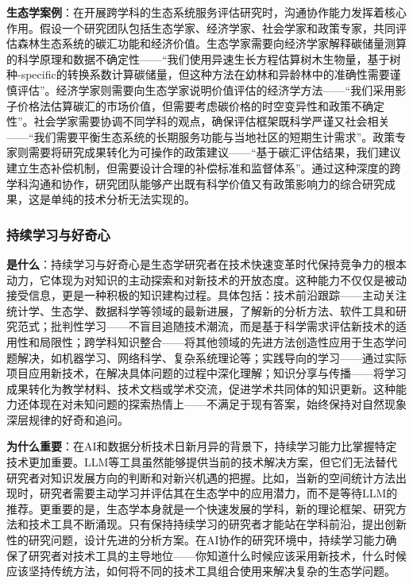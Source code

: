 \documentclass[
  twoside]{book}
\begin{document}
\textbf{生态学案例}：在开展跨学科的生态系统服务评估研究时，沟通协作能力发挥着核心作用。假设一个研究团队包括生态学家、经济学家、社会学家和政策专家，共同评估森林生态系统的碳汇功能和经济价值。生态学家需要向经济学家解释碳储量测算的科学原理和数据不确定性------``我们使用异速生长方程估算树木生物量，基于树种-specific的转换系数计算碳储量，但这种方法在幼林和异龄林中的准确性需要谨慎评估''。经济学家则需要向生态学家说明价值评估的经济学方法------``我们采用影子价格法估算碳汇的市场价值，但需要考虑碳价格的时空变异性和政策不确定性''。社会学家需要协调不同学科的观点，确保评估框架既科学严谨又社会相关------``我们需要平衡生态系统的长期服务功能与当地社区的短期生计需求''。政策专家则需要将研究成果转化为可操作的政策建议------``基于碳汇评估结果，我们建议建立生态补偿机制，但需要设计合理的补偿标准和监督体系''。通过这种深度的跨学科沟通和协作，研究团队能够产出既有科学价值又有政策影响力的综合研究成果，这是单纯的技术分析无法实现的。

\hypertarget{ux6301ux7eedux5b66ux4e60ux4e0eux597dux5947ux5fc3}{%
\subsubsection{持续学习与好奇心}\label{ux6301ux7eedux5b66ux4e60ux4e0eux597dux5947ux5fc3}}

\textbf{是什么}：持续学习与好奇心是生态学研究者在技术快速变革时代保持竞争力的根本动力，它体现为对知识的主动探索和对新技术的开放态度。这种能力不仅仅是被动接受信息，更是一种积极的知识建构过程。具体包括：技术前沿跟踪------主动关注统计学、生态学、数据科学等领域的最新进展，了解新的分析方法、软件工具和研究范式；批判性学习------不盲目追随技术潮流，而是基于科学需求评估新技术的适用性和局限性；跨学科知识整合------将其他领域的先进方法创造性应用于生态学问题解决，如机器学习、网络科学、复杂系统理论等；实践导向的学习------通过实际项目应用新技术，在解决具体问题的过程中深化理解；知识分享与传播------将学习成果转化为教学材料、技术文档或学术交流，促进学术共同体的知识更新。这种能力还体现在对未知问题的探索热情上------不满足于现有答案，始终保持对自然现象深层规律的好奇和追问。

\textbf{为什么重要}：在AI和数据分析技术日新月异的背景下，持续学习能力比掌握特定技术更加重要。LLM等工具虽然能够提供当前的技术解决方案，但它们无法替代研究者对知识发展方向的判断和对新兴机遇的把握。比如，当新的空间统计方法出现时，研究者需要主动学习并评估其在生态学中的应用潜力，而不是等待LLM的推荐。更重要的是，生态学本身就是一个快速发展的学科，新的理论框架、研究方法和技术工具不断涌现。只有保持持续学习的研究者才能站在学科前沿，提出创新性的研究问题，设计先进的分析方案。在AI协作的研究环境中，持续学习能力确保了研究者对技术工具的主导地位------你知道什么时候应该采用新技术，什么时候应该坚持传统方法，如何将不同的技术工具组合使用来解决复杂的生态学问题。
\end{document}
